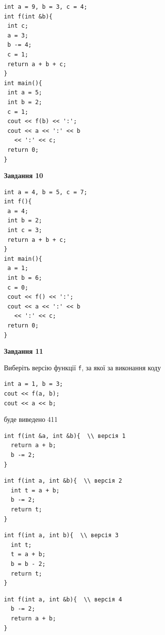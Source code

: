 \documentclass[12pt, ukrainian]{article}
\def\code#1{\Verb!#1!}
\begin{document}
{\begin {large}
\begin{minipage}[t]{7.0cm}
\begin{verbatim}
int a = 9, b = 3, c = 4;
int f(int &b){
 int c;
 a = 3;
 b -= 4;
 c = 1;
 return a + b + c;
}
int main(){
 int a = 5;
 int b = 2;
 c = 1;
 cout << f(b) << ':';
 cout << a << ':' << b 
   << ':' << c;
 return 0;
}
\end{verbatim}



\begin{center}
\textbf{Завдання 10}
\end{center}
\vspace{-8mm}

\begin{verbatim}
int a = 4, b = 5, c = 7;
int f(){
 a = 4;
 int b = 2;
 int c = 3;
 return a + b + c;
}
int main(){
 a = 1;
 int b = 6;
 c = 0;
 cout << f() << ':';
 cout << a << ':' << b 
   << ':' << c;
 return 0;
}
\end{verbatim}

\end{minipage}
\vline \hspace{1mm}
\begin{minipage}[t]{11.0cm}

\begin{center}
\textbf{Завдання 11}
\end{center}
Виберіть версію функції \code{f}, за якої за виконання коду
\begin{verbatim}
int a = 1, b = 3;
cout << f(a, b);
cout << a << b;
\end{verbatim}

буде виведено 411

\begin{verbatim}
int f(int &a, int &b){  \\ версія 1
  return a + b;
  b -= 2;
}
\end{verbatim}

\vspace{-8mm}\begin{verbatim}
int f(int a, int &b){  \\ версія 2
  int t = a + b;
  b -= 2;
  return t;
}
\end{verbatim}

\vspace{-8mm}\begin{verbatim}
int f(int a, int b){  \\ версія 3
  int t;
  t = a + b;
  b = b - 2;
  return t;
}
\end{verbatim}

\vspace{-8mm}\begin{verbatim}
int f(int a, int &b){  \\ версія 4
  b -= 2;
  return a + b;
}
\end{verbatim}




\end{minipage}
\end{large}}
\end{document}
